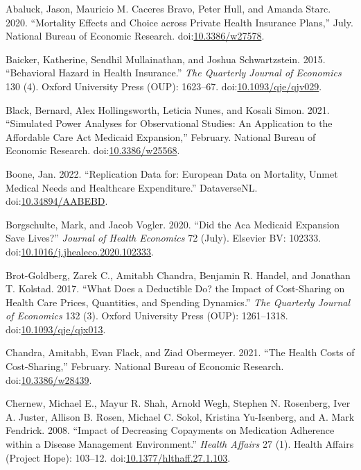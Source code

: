 \documentclass[a4paper,12pt]{article}
\begin{document}
\hypertarget{citeproc_bib_item_1}{Abaluck, Jason, Mauricio M. Caceres Bravo, Peter Hull, and Amanda Starc. 2020. “Mortality Effects and Choice across Private Health Insurance Plans,” July. National Bureau of Economic Research. doi:\href{https://doi.org/10.3386/w27578}{10.3386/w27578}.}

\hypertarget{citeproc_bib_item_2}{Baicker, Katherine, Sendhil Mullainathan, and Joshua Schwartzstein. 2015. “Behavioral Hazard in Health Insurance.” \textit{The Quarterly Journal of Economics} 130 (4). Oxford University Press (OUP): 1623–67. doi:\href{https://doi.org/10.1093/qje/qjv029}{10.1093/qje/qjv029}.}

\hypertarget{citeproc_bib_item_3}{Black, Bernard, Alex Hollingsworth, Leticia Nunes, and Kosali Simon. 2021. “Simulated Power Analyses for Observational Studies: An Application to the Affordable Care Act Medicaid Expansion,” February. National Bureau of Economic Research. doi:\href{https://doi.org/10.3386/w25568}{10.3386/w25568}.}

\hypertarget{citeproc_bib_item_4}{Boone, Jan. 2022. “Replication Data for: European Data on Mortality, Unmet Medical Needs and Healthcare Expenditure.” DataverseNL. doi:\href{https://doi.org/10.34894/AABEBD}{10.34894/AABEBD}.}

\hypertarget{citeproc_bib_item_5}{Borgschulte, Mark, and Jacob Vogler. 2020. “Did the Aca Medicaid Expansion Save Lives?” \textit{Journal of Health Economics} 72 (July). Elsevier BV: 102333. doi:\href{https://doi.org/10.1016/j.jhealeco.2020.102333}{10.1016/j.jhealeco.2020.102333}.}

\hypertarget{citeproc_bib_item_6}{Brot-Goldberg, Zarek C., Amitabh Chandra, Benjamin R. Handel, and Jonathan T. Kolstad. 2017. “What Does a Deductible Do? the Impact of Cost-Sharing on Health Care Prices, Quantities, and Spending Dynamics.” \textit{The Quarterly Journal of Economics} 132 (3). Oxford University Press (OUP): 1261–1318. doi:\href{https://doi.org/10.1093/qje/qjx013}{10.1093/qje/qjx013}.}

\hypertarget{citeproc_bib_item_7}{Chandra, Amitabh, Evan Flack, and Ziad Obermeyer. 2021. “The Health Costs of Cost-Sharing,” February. National Bureau of Economic Research. doi:\href{https://doi.org/10.3386/w28439}{10.3386/w28439}.}

\hypertarget{citeproc_bib_item_8}{Chernew, Michael E., Mayur R. Shah, Arnold Wegh, Stephen N. Rosenberg, Iver A. Juster, Allison B. Rosen, Michael C. Sokol, Kristina Yu-Isenberg, and A. Mark Fendrick. 2008. “Impact of Decreasing Copayments on Medication Adherence within a Disease Management Environment.” \textit{Health Affairs} 27 (1). Health Affairs (Project Hope): 103–12. doi:\href{https://doi.org/10.1377/hlthaff.27.1.103}{10.1377/hlthaff.27.1.103}.}
\end{document}
